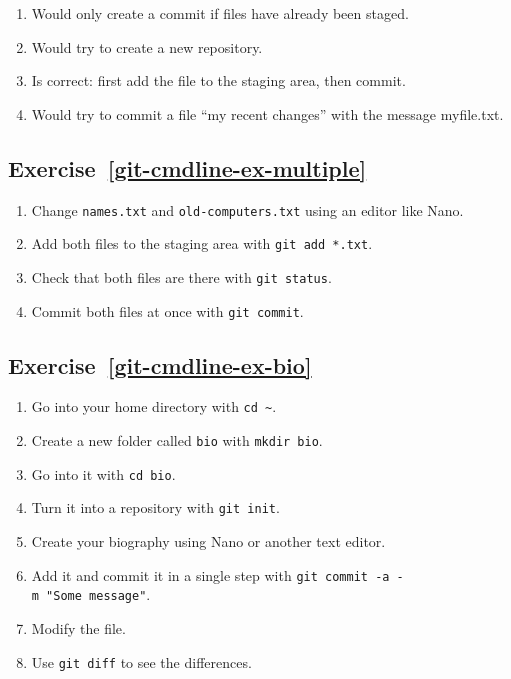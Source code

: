 \documentclass[
]{krantz}
\providecommand{\tightlist}{%
  \setlength{\itemsep}{0pt}\setlength{\parskip}{0pt}}
\begin{document}
\begin{enumerate}
\def\labelenumi{\arabic{enumi}.}
\tightlist
\item
  Would only create a commit if files have already been staged.
\item
  Would try to create a new repository.
\item
  Is correct: first add the file to the staging area, then commit.
\item
  Would try to commit a file ``my recent changes'' with the message myfile.txt.
\end{enumerate}

\hypertarget{exercise-refgit-cmdline-ex-multiple}{%
\subsection*{Exercise~\ref{git-cmdline-ex-multiple}}\label{exercise-refgit-cmdline-ex-multiple}}


\begin{enumerate}
\def\labelenumi{\arabic{enumi}.}
\tightlist
\item
  Change \texttt{names.txt} and \texttt{old-computers.txt} using an editor like Nano.
\item
  Add both files to the staging area with \texttt{git\ add\ *.txt}.
\item
  Check that both files are there with \texttt{git\ status}.
\item
  Commit both files at once with \texttt{git\ commit}.
\end{enumerate}

\hypertarget{exercise-refgit-cmdline-ex-bio}{%
\subsection*{Exercise~\ref{git-cmdline-ex-bio}}\label{exercise-refgit-cmdline-ex-bio}}


\begin{enumerate}
\def\labelenumi{\arabic{enumi}.}
\tightlist
\item
  Go into your home directory with \texttt{cd\ \textasciitilde{}}.
\item
  Create a new folder called \texttt{bio} with \texttt{mkdir\ bio}.
\item
  Go into it with \texttt{cd\ bio}.
\item
  Turn it into a repository with \texttt{git\ init}.
\item
  Create your biography using Nano or another text editor.
\item
  Add it and commit it in a single step with \texttt{git\ commit\ -a\ -m\ "Some\ message"}.
\item
  Modify the file.
\item
  Use \texttt{git\ diff} to see the differences.
\end{enumerate}
\end{document}
